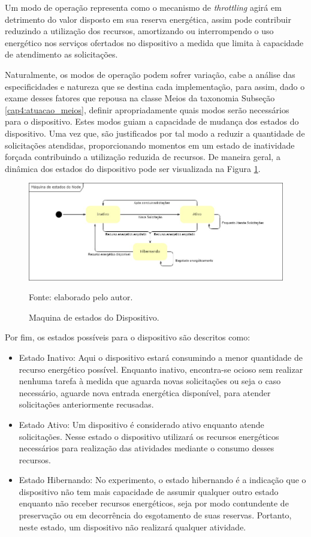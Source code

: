 Um modo de operação representa como o mecanismo de \textit{throttling} agirá em detrimento do valor disposto em sua reserva energética, assim pode contribuir reduzindo a utilização dos recursos, amortizando ou interrompendo o uso energético nos serviços ofertados no dispositivo a medida que limita à capacidade de atendimento as solicitações. 

Naturalmente, os modos de operação podem sofrer variação, cabe a análise das especificidades e natureza que se destina cada implementação, para assim, dado o exame desses fatores que repousa na classe Meios da taxonomia Subseção \ref{cap4:atuacao_meios}, definir apropriadamente quais modos serão necessários para o dispositivo. Estes modos guiam a capacidade de mudança dos estados do dispositivo. Uma vez que, são justificados por tal modo a reduzir a quantidade de solicitações atendidas, proporcionando momentos em um estado de inatividade forçada contribuindo a utilização reduzida de recursos. De maneira geral, a dinâmica dos estados do dispositivo pode ser visualizada na Figura \ref{fig:cap6maquinaestados}. 

\begin{figure}[H]
	\centering
	
	\caption{Maquina de estados do Dispositivo.}
	\label{fig:cap6maquinaestados}
	\noindent\includegraphics[width=0.75\linewidth]{Imagens/cap6/cap6maquinaestados.jpg} 
	
	Fonte: elaborado pelo autor.
\end{figure}

Por fim, os estados possíveis para o dispositivo são descritos como:
\begin{itemize}
	\item Estado Inativo: Aqui o dispositivo estará consumindo a menor quantidade de recurso energético possível. Enquanto inativo, encontra-se ocioso sem realizar nenhuma tarefa à medida que aguarda novas solicitações ou seja o caso necessário, aguarde nova entrada energética disponível, para atender solicitações anteriormente recusadas.
	\item Estado Ativo: Um dispositivo é considerado ativo enquanto atende solicitações. Nesse estado o dispositivo utilizará os recursos energéticos necessários para realização das atividades mediante o consumo desses recursos. 
	\item Estado Hibernando: No experimento, o estado hibernando é a indicação que o dispositivo não tem mais capacidade de assumir qualquer outro estado enquanto não receber recursos energéticos, seja por modo contundente de preservação ou em decorrência do esgotamento de suas reservas. Portanto, neste estado, um dispositivo não realizará qualquer atividade.	
	
\end{itemize}

